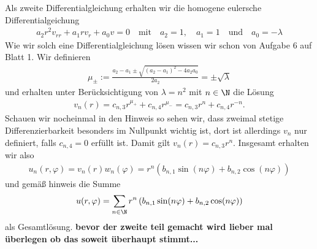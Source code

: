 \begin{solution}
	Als zweite Differentialgleichung erhalten wir die homogene eulersche Differentialgeichung 
	\begin{align*}
	a_2 r^2 v_{rr} + a_1 r v_r + a_0 v = 0 \quad \text{mit} \quad a_2 = 1, \quad a_1 = 1 \quad \text{und} \quad a_0 = -\lambda
	\end{align*}
	Wie wir solch eine Differentialgleichung lösen wissen wir schon von Aufgabe 6 auf Blatt 1. Wir definieren 
	\begin{align*}
	\mu_\pm := \frac{a_2 - a_1 \pm \sqrt{(a_2 - a_1)^2 - 4a_2a_0}}{2a_2} = \pm \sqrt{\lambda}  
	\end{align*}
	und erhalten unter Berücksichtigung von $\lambda = n^2$ mit $n \in \N$ die Lösung
	\begin{align*}
	v_n(r) = c_{n,3} r^{\mu_+} + c_{n,4} r^{\mu_-} = c_{n,3} r^{n} + c_{n,4} r^{-n}.
	\end{align*}
	Schauen wir nocheinmal in den Hinweis so sehen wir, dass zweimal stetige Differenzierbarkeit besonders im Nullpunkt wichtig ist, dort ist allerdings $v_n$ nur definiert, falls $c_{n,4} = 0$ erfüllt ist. Damit gilt $v_n(r) = c_{n,3} r^{n}$.
	Insgesamt erhalten wir also 
	\begin{align*}
	u_n(r,\varphi) = v_n(r) w_n(\varphi) = r^n \left(b_{n,1} \sin(n\varphi) + b_{n,2} \cos(n\varphi)\right)
	\end{align*}
	und gemäß hinweis die Summe
	\begin{align*}
	u(r, \varphi) = \sum_{n \in \N} r^n \left(b_{n,1} \sin(n\varphi) + b_{n,2} \cos(n\varphi)\right)
	\end{align*}
	als Gesamtlösung.
	\textbf{bevor der zweite teil gemacht wird lieber mal überlegen ob das soweit überhaupt stimmt...}
\end{solution}
